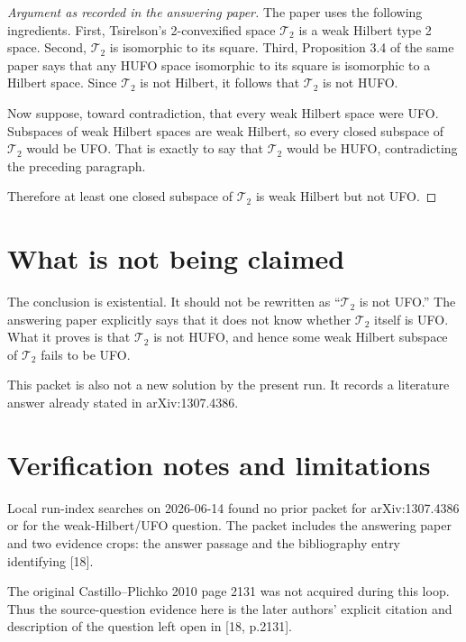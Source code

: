 \documentclass[11pt]{article}
\newcommand{\Ttwo}{\mathcal T_2}
\begin{document}
\begin{proof}[Argument as recorded in the answering paper]
The paper uses the following ingredients. First, Tsirelson's 2-convexified
space \(\Ttwo\) is a weak Hilbert type 2 space. Second, \(\Ttwo\) is
isomorphic to its square. Third, Proposition 3.4 of the same paper says that
any HUFO space isomorphic to its square is isomorphic to a Hilbert space.
Since \(\Ttwo\) is not Hilbert, it follows that \(\Ttwo\) is not HUFO.

Now suppose, toward contradiction, that every weak Hilbert space were UFO.
Subspaces of weak Hilbert spaces are weak Hilbert, so every closed subspace of
\(\Ttwo\) would be UFO. That is exactly to say that \(\Ttwo\) would be HUFO,
contradicting the preceding paragraph.

Therefore at least one closed subspace of \(\Ttwo\) is weak Hilbert but not
UFO.
\end{proof}

\section*{What is not being claimed}

The conclusion is existential. It should not be rewritten as ``\(\Ttwo\) is
not UFO.'' The answering paper explicitly says that it does not know whether
\(\Ttwo\) itself is UFO. What it proves is that \(\Ttwo\) is not HUFO, and
hence some weak Hilbert subspace of \(\Ttwo\) fails to be UFO.

This packet is also not a new solution by the present run. It records a
literature answer already stated in arXiv:1307.4386.

\section*{Verification notes and limitations}

Local run-index searches on 2026-06-14 found no prior packet for
arXiv:1307.4386 or for the weak-Hilbert/UFO question. The packet includes the
answering paper and two evidence crops: the answer passage and the
bibliography entry identifying [18].

The original Castillo--Plichko 2010 page 2131 was not acquired during this
loop. Thus the source-question evidence here is the later authors' explicit
citation and description of the question left open in [18, p.2131].
\end{document}
